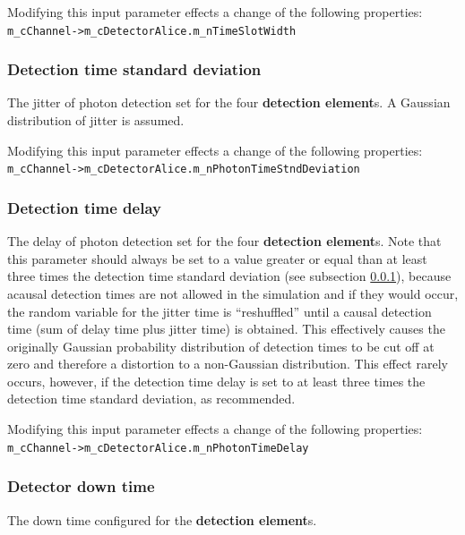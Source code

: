 Modifying this input parameter effects a change of the following properties\hyperlink{fn:modinfo}{\footnotemark[\value{fnmodinfo}]}:\\
\texttt{m\_cChannel->m\_cDetectorAlice.m\_nTimeSlotWidth}

\subsubsection{Detection time standard deviation}
\label{subsubsec:gui_alice_det_time_stnd_dev}
The jitter of photon detection set for the four \textbf{detection element}s. A Gaussian distribution of jitter is assumed.

Modifying this input parameter effects a change of the following properties\hyperlink{fn:modinfo}{\footnotemark[\value{fnmodinfo}]}:\\
\texttt{m\_cChannel->m\_cDetectorAlice.m\_nPhotonTimeStndDeviation}

\subsubsection{Detection time delay}
\label{subsubsec:gui_alice_det_time_delay}
The delay of photon detection set for the four \textbf{detection element}s. Note that this parameter should always be set to a value greater or equal than at least three times the detection time standard deviation (see subsection \ref{subsubsec:gui_alice_det_time_stnd_dev}), because acausal detection times are not allowed in the simulation and if they would occur, the random variable for the jitter time is ``reshuffled'' until a causal detection time (sum of delay time plus jitter time) is obtained. This effectively causes the originally Gaussian probability distribution of detection times to be cut off at zero and therefore a distortion to a non-Gaussian distribution. This effect rarely occurs, however, if the detection time delay is set to at least three times the detection time standard deviation, as recommended.

Modifying this input parameter effects a change of the following properties\hyperlink{fn:modinfo}{\footnotemark[\value{fnmodinfo}]}:\\
\texttt{m\_cChannel->m\_cDetectorAlice.m\_nPhotonTimeDelay}

\subsubsection{Detector down time}
The down time configured for the \textbf{detection element}s.


